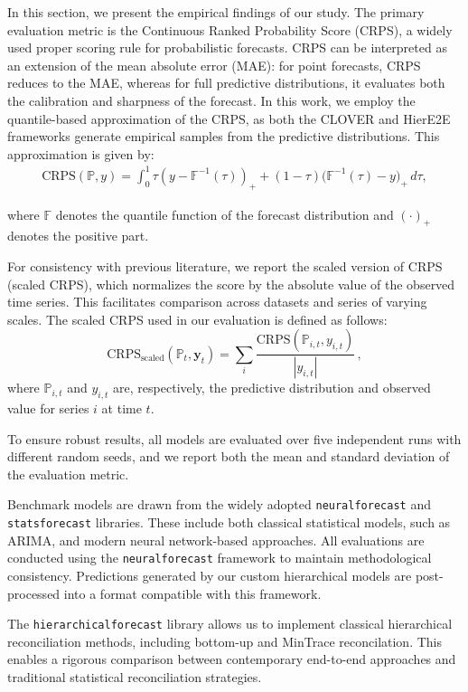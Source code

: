 \documentclass[letterpaper]{article}
\begin{document}
In this section, we present the empirical findings of our study. The primary evaluation metric is the Continuous Ranked Probability Score (CRPS), a widely used proper scoring rule for probabilistic forecasts. CRPS can be interpreted as an extension of the mean absolute error (MAE): for point forecasts, CRPS reduces to the MAE, whereas for full predictive distributions, it evaluates both the calibration and sharpness of the forecast. In this work, we employ the quantile-based approximation of the CRPS, as both the CLOVER and HierE2E frameworks generate empirical samples from the predictive distributions. This approximation is given by:
\begin{align*}
    \text{CRPS}(\mathbb{P}, y) = \int_0^1 \tau(y - \mathbb{F}^{-1}(\tau))_+ + (1-\tau)\big(\mathbb{F}^{-1}(\tau) - y\big)_+\, d\tau,
\end{align*}

where $\mathbb{F}$ denotes the quantile function of the forecast distribution and $(\cdot)_+$ denotes the positive part.

For consistency with previous literature, we report the scaled version of CRPS (scaled CRPS), which normalizes the score by the absolute value of the observed time series. This facilitates comparison across datasets and series of varying scales. The scaled CRPS used in our evaluation is defined as follows:
\[
\text{CRPS}_{\text{scaled}}(\mathbf{\mathbb{P}}_t, \mathbf{y}_t) = \sum_i \frac{\text{CRPS}(\mathbb{P}_{i,t}, y_{i,t})}{|y_{i,t}|} \,,
\]
where $\mathbb{P}_{i,t}$ and $y_{i,t}$ are, respectively, the predictive distribution and observed value for series $i$ at time $t$.

To ensure robust results, all models are evaluated over five independent runs with different random seeds, and we report both the mean and standard deviation of the evaluation metric.

Benchmark models are drawn from the widely adopted \texttt{neuralforecast} and \texttt{statsforecast} libraries. These include both classical statistical models, such as ARIMA, and modern neural network-based approaches. All evaluations are conducted using the \texttt{neuralforecast} framework to maintain methodological consistency. Predictions generated by our custom hierarchical models are post-processed into a format compatible with this framework.

The \texttt{hierarchicalforecast} library allows us to implement classical hierarchical reconciliation methods, including bottom-up and MinTrace reconcilation. This enables a rigorous comparison between contemporary end-to-end approaches and traditional statistical reconciliation strategies.
\end{document}
